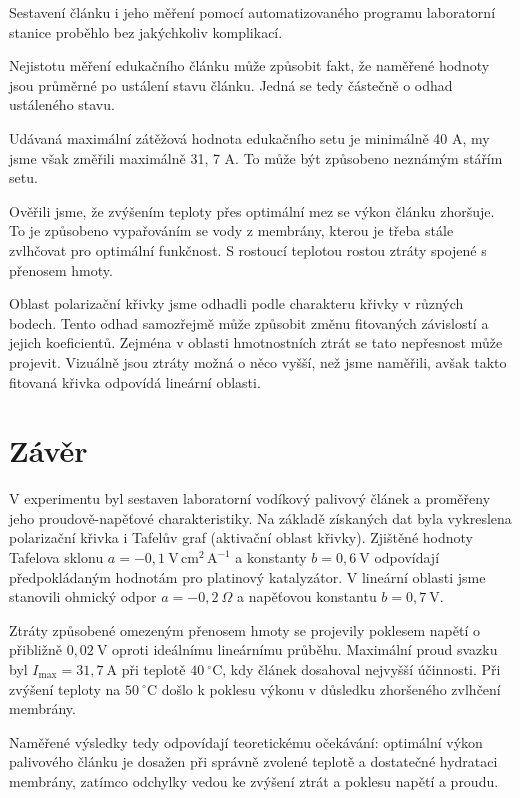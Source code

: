 Sestavení článku i jeho měření pomocí automatizovaného programu laboratorní stanice proběhlo bez jakýchkoliv komplikací.

Nejistotu měření edukačního článku může způsobit fakt, že naměřené hodnoty jsou průměrné po ustálení stavu článku. Jedná se tedy částečně o odhad ustáleného stavu.

Udávaná maximální zátěžová hodnota edukačního setu je minimálně 40 A, my jsme však změřili maximálně 31, 7 A. To může být způsobeno neznámým stářím setu.

Ověřili jsme, že zvýšením teploty přes optimální mez se výkon článku zhoršuje. To je způsobeno vypařováním se vody z membrány, kterou je třeba stále zvlhčovat pro optimální funkčnost. S rostoucí teplotou rostou ztráty spojené s přenosem hmoty.

Oblast polarizační křivky jsme odhadli podle charakteru křivky v různých bodech. Tento odhad samozřejmě může způsobit změnu fitovaných závislostí a jejich koeficientů. Zejména v oblasti hmotnostních ztrát se tato nepřesnost může projevit. Vizuálně jsou ztráty možná o něco vyšší, než jsme naměřili, avšak takto fitovaná křivka odpovídá lineární oblasti.

\newpage
\section{Závěr}

V experimentu byl sestaven laboratorní vodíkový palivový článek a proměřeny jeho proudově-napěťové charakteristiky. Na základě získaných dat byla vykreslena polarizační křivka i Tafelův graf (aktivační oblast křivky). Zjištěné hodnoty Tafelova sklonu $a = -0{,}1~\mathrm{V\,cm^2\,A^{-1}}$ a konstanty $b = 0{,}6~\mathrm{V}$ odpovídají předpokládaným hodnotám pro platinový katalyzátor. V lineární oblasti jsme stanovili ohmický odpor $a = -0{,}2~\Omega$ a napěťovou konstantu $b = 0{,}7~\mathrm{V}$. 

Ztráty způsobené omezeným přenosem hmoty se projevily poklesem napětí o přibližně $0{,}02~\mathrm{V}$ oproti ideálnímu lineárnímu průběhu. Maximální proud svazku byl $I_\mathrm{max} = 31{,}7~\mathrm{A}$ při teplotě $40~^\circ\mathrm{C}$, kdy článek dosahoval nejvyšší účinnosti. Při zvýšení teploty na $50~^\circ\mathrm{C}$ došlo k poklesu výkonu v důsledku zhoršeného zvlhčení membrány.

Naměřené výsledky tedy odpovídají teoretickému očekávání: optimální výkon palivového článku je dosažen při správně zvolené teplotě a dostatečné hydrataci membrány, zatímco odchylky vedou ke zvýšení ztrát a poklesu napětí a proudu.
